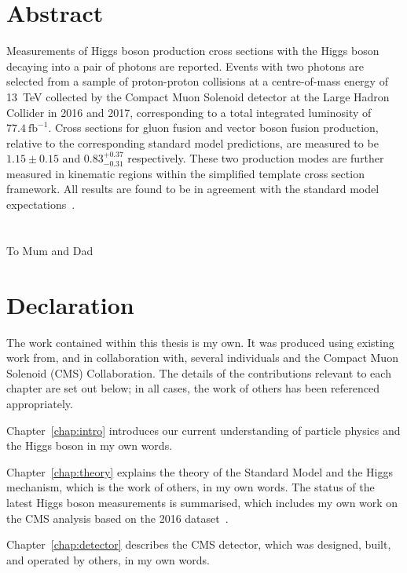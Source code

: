 \chapter*{\centering Abstract}
Measurements of Higgs boson production cross sections 
with the Higgs boson decaying into a pair of photons are reported.
Events with two photons are selected from a sample of proton-proton collisions 
at a centre-of-mass energy of \SI{13}{TeV} 
collected by the Compact Muon Solenoid detector at the Large Hadron Collider in 2016 and 2017,
corresponding to a total integrated luminosity of $77.4~\mathrm{fb}^{-1}$.
Cross sections for gluon fusion and vector boson fusion production, 
relative to the corresponding standard model predictions,
are measured to be $1.15 \pm 0.15$ and $0.83_{-0.31}^{+0.37}$ respectively.
These two production modes are further measured in kinematic regions 
within the simplified template cross section framework.
All results are found to be in agreement with the standard model expectations~\cite{HIG-18-029}.


\chapter*{\centering }%
\begin{center}
    \thispagestyle{empty}
    To Mum and Dad
\end{center}


\chapter*{\centering Declaration}
The work contained within this thesis is my own. 
It was produced using existing work from, and in collaboration with, 
several individuals and the Compact Muon Solenoid (CMS) Collaboration. 
The details of the contributions relevant to each chapter are set out below;
in all cases, the work of others has been referenced appropriately.

Chapter~\ref{chap:intro} introduces our current understanding of particle physics 
and the Higgs boson in my own words.

Chapter~\ref{chap:theory} explains the theory of the Standard Model and the Higgs mechanism, 
which is the work of others, in my own words. 
The status of the latest Higgs boson measurements is summarised, 
which includes my own work on the CMS \Hgg analysis based on the 2016 dataset~\cite{HIG-16-040}.

Chapter~\ref{chap:detector} describes the CMS detector, 
which was designed, built, and operated by others, in my own words.

